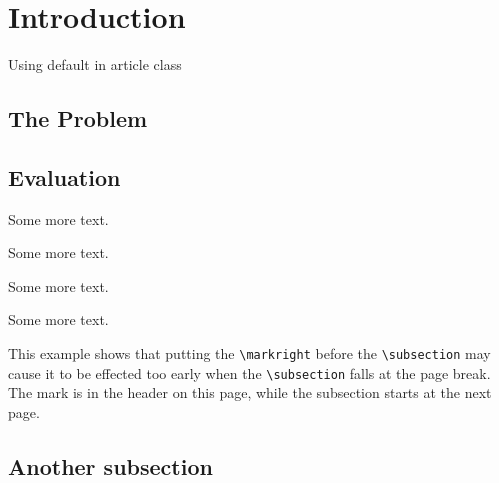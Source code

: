 \documentclass{article}
\begin{document}
\tableofcontents

\section{Introduction}

Using default in article class

\subsection{The Problem}
\label{sec:problem}

\lipsum[1]

\subsection{Evaluation}

\lipsum

Some more text.

Some more text.

Some more text.

Some more text.

This example shows that putting the \verb+\markright+ before the \verb+\subsection+ may cause it to be effected too early when the \verb+\subsection+ falls at the page break. The mark is in the header on this page, while the subsection starts at the next page.


\subsection{Another subsection}

\lipsum[3]
\end{document}
